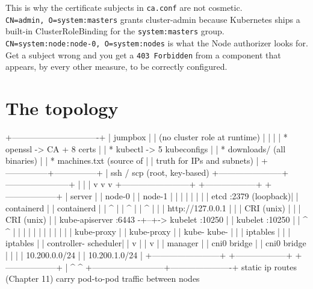\documentclass[11pt,oneside]{report}
\begin{document}
This is why the
certificate subjects
in \texttt{ca.conf}
are not cosmetic.
\texttt{CN=admin,\ O=system:}\allowbreak{}\texttt{masters}
grants cluster-admin
because Kubernetes
ships a built-in
ClusterRoleBinding
for the
\texttt{system:masters}
group.
\texttt{CN=system:}\allowbreak{}\texttt{node:}\allowbreak{}\texttt{node-}\allowbreak{}\texttt{0,\ O=system:}\allowbreak{}\texttt{nodes}
is what the Node
authorizer looks
for. Get a subject
wrong and you get a
\texttt{403\ Forbidden}
from a component
that appears, by
every other measure,
to be correctly
configured.

\hypertarget{the-topology}{%
\section{The
topology}\label{the-topology}}

\begin{outlst}
                        +-------------------------------+
                        |          jumpbox              |
                        |  (no cluster role at runtime) |
                        |                               |
                        |  * openssl -> CA + 8 certs    |
                        |  * kubectl -> 5 kubeconfigs   |
                        |  * downloads/ (all binaries)  |
                        |  * machines.txt (source of    |
                        |    truth for IPs and subnets) |
                        +---------------+---------------+
                                        | ssh / scp (root, key-based)
                +-----------------------+-----------------------+
                |                       |                       |
                v                       v                       v
   +------------------------+  +------------------+  +------------------+
   |        server          |  |      node-0      |  |      node-1      |
   |                        |  |                  |  |                  |
   |  etcd  :2379 (loopback)|  |  containerd      |  |  containerd      |
   |    ^                   |  |    ^             |  |    ^             |
   |    | http://127.0.0.1  |  |    | CRI (unix)  |  |    | CRI (unix)  |
   |  kube-apiserver :6443 -+--+-> kubelet :10250 |  |  kubelet :10250  |
   |    ^          ^        |  |    |             |  |    |             |
   |    |          |        |  |  kube-proxy      |  |  kube-proxy      |
   |  kube-        kube-    |  |    | iptables    |  |    | iptables    |
   |  controller-  scheduler|  |    v             |  |    v             |
   |  manager               |  |  cni0 bridge     |  |  cni0 bridge     |
   |                        |  |  10.200.0.0/24   |  |  10.200.1.0/24   |
   +------------------------+  +------------------+  +------------------+
            |                          ^                      ^
            +--------------------------+----------------------+
                   static ip routes (Chapter 11) carry
                   pod-to-pod traffic between nodes
\end{outlst}
\end{document}
